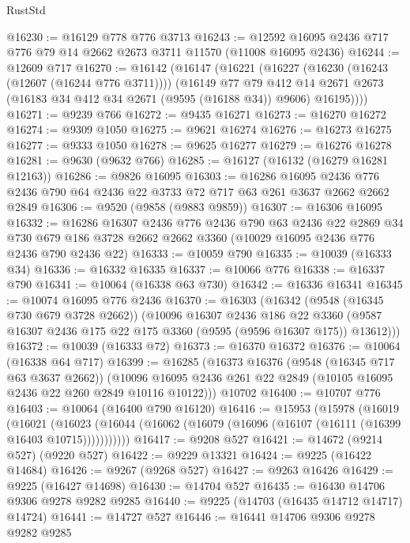 \begin{lexlean}{RustStd}
\begin{coremodule}
@16230 := @16129 @778 @776 @3713
@16243 := @12592 @16095 @2436 @717 @776 @79 @14 @2662 @2673 @3711 @11570 (@11008 @16095 @2436)
@16244 := @12609 @717
@16270 := @16142
    (@16147
      (@16221
        (@16227
          (@16230 (@16243 (@12607 (@16244 @776 @3711))))
          (@16149
            @77
            @79
            @412
            @14
            @2671
            @2673
            (@16183 @34 @412 @34 @2671 (@9595 (@16188 @34)) @9606)
            @16195))))
@16271 := @9239 @766
@16272 := @9435 @16271
@16273 := @16270 @16272
@16274 := @9309 @1050
@16275 := @9621 @16274
@16276 := @16273 @16275
@16277 := @9333 @1050
@16278 := @9625 @16277
@16279 := @16276 @16278
@16281 := @9630 (@9632 @766)
@16285 := @16127 (@16132 (@16279 @16281 @12163))
@16286 := @9826 @16095
@16303 := @16286
    @16095
    @2436
    @776
    @2436
    @790
    @64
    @2436
    @22
    @3733
    @72
    @717
    @63
    @261
    @3637
    @2662
    @2662
    @2849
@16306 := @9520 (@9858 (@9883 @9859))
@16307 := @16306 @16095
@16332 := @16286
    @16307
    @2436
    @776
    @2436
    @790
    @63
    @2436
    @22
    @2869
    @34
    @730
    @679
    @186
    @3728
    @2662
    @2662
    @3360
    (@10029 @16095 @2436 @776 @2436 @790 @2436 @22)
@16333 := @10059 @790
@16335 := @10039 (@16333 @34)
@16336 := @16332 @16335
@16337 := @10066 @776
@16338 := @16337 @790
@16341 := @10064 (@16338 @63 @730)
@16342 := @16336 @16341
@16345 := @10074 @16095 @776 @2436
@16370 := @16303
    (@16342
      (@9548 (@16345 @730 @679 @3728 @2662))
      (@10096
        @16307
        @2436
        @186
        @22
        @3360
        (@9587 @16307 @2436 @175 @22 @175 @3360 (@9595 (@9596 @16307 @175)) @13612)))
@16372 := @10039 (@16333 @72)
@16373 := @16370 @16372
@16376 := @10064 (@16338 @64 @717)
@16399 := @16285
    (@16373
      @16376
      (@9548 (@16345 @717 @63 @3637 @2662))
      (@10096 @16095 @2436 @261 @22 @2849 (@10105 @16095 @2436 @22 @260 @2849 @10116 @10122)))
    @10702
@16400 := @10707 @776
@16403 := @10064 (@16400 @790 @16120)
@16416 := @15953
    (@15978
      (@16019
        (@16021
          (@16023 (@16044 (@16062 (@16079 (@16096 (@16107 (@16111 (@16399 @16403 @10715)))))))))))
@16417 := @9208 @527
@16421 := @14672 (@9214 @527) (@9220 @527)
@16422 := @9229 @13321
@16424 := @9225 (@16422 @14684)
@16426 := @9267 (@9268 @527)
@16427 := @9263 @16426
@16429 := @9225 (@16427 @14698)
@16430 := @14704 @527
@16435 := @16430 @14706 @9306 @9278 @9282 @9285
@16440 := @9225 (@14703 (@16435 @14712 @14717) @14724)
@16441 := @14727 @527
@16446 := @16441 @14706 @9306 @9278 @9282 @9285

\end{coremodule}
\end{lexlean}
